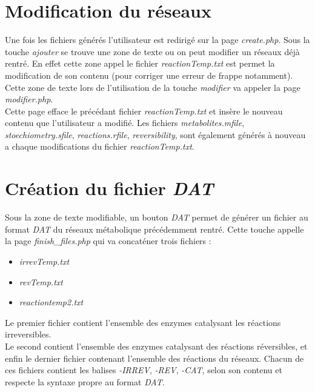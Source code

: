 \section{Modification du réseaux}
Une fois les fichiers générés l'utilisateur est redirigé sur la page \emph{create.php}.
Sous la touche \emph{ajouter} se trouve une zone de texte ou on peut modifier un réseaux déjà rentré. En effet cette zone appel le fichier \emph{reactionTemp.txt} est permet la modification de son contenu (pour corriger une erreur de frappe notamment). Cette zone de texte lors de l'utilisation de la touche \emph{modifier} va appeler la page \emph{modifier.php}.\\
 Cette page efface le précédant fichier \emph{reactionTemp.txt} et insère le nouveau contenu que l'utilisateur a modifié.
 Les fichiers \emph{metabolites.mfile}, \emph{stoechiometry.sfile}, \emph{reactions.rfile}, \emph{reversibility}, sont également générés à nouveau a chaque modifications du fichier \emph{reactionTemp.txt}.
 
\section{Création du fichier \emph{DAT}}
Sous la zone de texte modifiable, un bouton \emph{DAT} permet de générer un fichier au format \emph{DAT} du réseaux métabolique précédemment rentré.
Cette touche appelle la page \emph{finish\_files.php} qui va concaténer trois fichiers :
\begin{itemize}
\item \emph{irrevTemp.txt}
\item \emph{revTemp.txt}
\item \emph{reactiontemp2.txt}
\end{itemize}
Le premier fichier contient l'ensemble des enzymes catalysant les réactions irreversibles.\\
Le second contient l'ensemble des enzymes catalysant des réactions réversibles, et enfin le dernier fichier contenant l'ensemble des réactions du réseaux.
Chacun de ces fichiers contient les balises \emph{-IRREV}, \emph{-REV}, \emph{-CAT}, selon son contenu et respecte la syntaxe propre au format \emph{DAT}.



